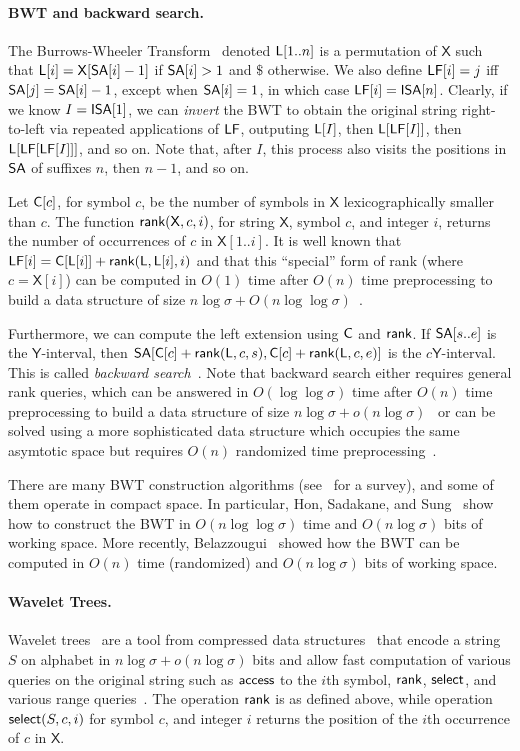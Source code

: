 \documentclass[11pt,runningheads]{llncs}
\def\SA{\mbox{\rm {\sf SA}}}
\def\ISA{\mbox{\rm {\sf ISA}}}
\def\LF{\mbox{\rm {\sf LF}}}
\def\rank{\mbox{\rm {\sf rank}}}
\def\select{\mbox{\rm {\sf select}}}
\def\access{\mbox{\rm {\sf access}}}
\def\X{\mathsf{X}}
\def\Y{\mbox{\rm {\sf Y}}}
\def\Y{\mathsf{Y}}
\def\C{\mbox{\rm {\sf C}}}
\def\BWT{\mbox{\rm {\sf L}}}
\begin{document}
 \paragraph{BWT and backward search.}
 The Burrows-Wheeler Transform~\cite{bw1994} denoted $\BWT[1..n]$ is a
 permutation of $\X$ such that $\BWT[i] = \X[\SA[i]-1]$ if $\SA[i]>1$
 and $\$$ otherwise. We also define $\LF[i] = j$ iff $\SA[j] =
 \SA[i]-1$, except when $\SA[i] = 1$, in which case $\LF[i] = \ISA[n]$.
 Clearly, if we know $I = \ISA[1]$, we can {\em invert} the BWT to obtain the original string 
 right-to-left via repeated applications of $\LF$, outputing $\BWT[I]$, then
 $\BWT[\LF[I]]$, then $\BWT[\LF[\LF[I]]]$, and so on. Note that, after $I$, 
 this process also visits the positions in $\SA$ of suffixes $n$, then $n-1$, and so on.
 
 Let $\C[c]$, for symbol $c$, be the number of symbols
 in $\X$ lexicographically smaller than $c$.  The function
 $\rank(\X,c,i)$, for string $\X$, symbol $c$, and integer $i$, returns
 the number of occurrences of $c$ in $\X[1..i]$.  It is well known that
 $\LF[i] = \C[\BWT[i]] + \rank(\BWT,\BWT[i],i)$ and that this ``special''
 form of rank (where $c = \X[i]$) can be computed in $O(1)$ time after
 $O(n)$ time preprocessing to build a data structure of size $n\log\sigma+O(n\log\log\sigma)$~\cite{BN2014}.

 Furthermore, we can
 compute the left extension using $\C$ and $\rank$.  If $\SA[s..e]$ is
 the $\Y$-interval,
 then
 $\SA[\C[c]+\rank(\BWT,c,s),\C[c]+\rank(\BWT,c,e)]$ is
 the $c\Y$-interval.
 This is called \emph{backward search}~\cite{fm2005}. Note that backward
 search either requires general rank queries, which can be answered in $O(\log\log \sigma)$ time after
 $O(n)$ time preprocessing to build a data structure of size $n\log\sigma+o(n\log\sigma)$~\cite{GOR10}
or can be solved using a more sophisticated data structure which occupies the same asymtotic space 
but requires $O(n)$ randomized time preprocessing~\cite{BN2014}.

There are many BWT construction algorithms (see~\cite{pst2007} for a survey),
and some of them operate in compact space. In particular, 
Hon, Sadakane, and Sung~\cite{hss2009} show 
how to construct the BWT in $O(n\log\log\sigma)$ time and $O(n\log\sigma)$ 
bits of working space. More recently, Belazzougui~\cite{b2014} showed how the BWT can be computed 
in $O(n)$ time (randomized) and $O(n\log\sigma)$ bits of working space.

\paragraph{Wavelet Trees.}
Wavelet trees~\cite{GGV03} are a tool from compressed data structures~\cite{nm2007} 
that encode a string $S$ on alphabet in $n\log\sigma + o(n\log\sigma)$ bits and allow 
fast computation of various queries on the original string such as $\access$ to the
$i$th symbol, $\rank$, $\select$, and various range queries~\cite{navarro2014wavelet}. 
The operation $\rank$ is as defined above, while operation $\select(S,c,i)$ 
for symbol $c$, and integer $i$ returns the position of the 
$i$th occurrence of $c$ in $\X$.  
\end{document}
